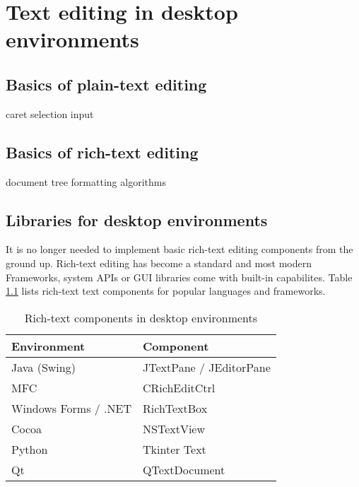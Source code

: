 
\chapter{Text editing in desktop environments}

\section{Basics of plain-text editing} %

caret
selection
input

\section{Basics of rich-text editing} %

document tree
formatting algorithms


\section{Libraries for desktop environments}

It is no longer needed to implement basic rich-text editing components from the ground up. Rich-text editing has become a standard and most modern Frameworks, system APIs or GUI libraries come with built-in capabilites. Table \ref{table:rich-text-components-desktop} lists rich-text text components for popular languages and frameworks.

\begin{table}[]
\centering
\begin{tabular}{ll}
\hline
Environment & Component \\ \hline
Java (Swing) & JTextPane / JEditorPane \\
MFC & CRichEditCtrl \\
Windows Forms / .NET & RichTextBox \\
Cocoa & NSTextView \\
Python & Tkinter Text \\
Qt & QTextDocument \\ \hline
\end{tabular}
\caption{Rich-text components in desktop environments}
\label{table:rich-text-components-desktop}
\end{table}
